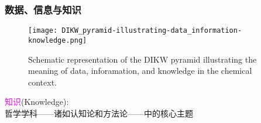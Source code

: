 \small
%
\frame
{
	\frametitle{数据、信息与知识}
\begin{figure}[h!]
\centering
\vskip -10pt
\texttt{[image: DIKW\_pyramid-illustrating-data\_information-knowledge.png]}
\caption{\tiny\textrm{Schematic representation of the DIKW pyramid illustrating the meaning of data, inforamation, and knowledge in the chemical context.\cite{ACR56-128_2023}}}%
\label{Fig:Knowledge-based_system}
\end{figure}
\textcolor{magenta}{知识}\textrm{(Knowledge)}:\\
哲学学科——诸如认知论和方法论——中的核心主题
}

